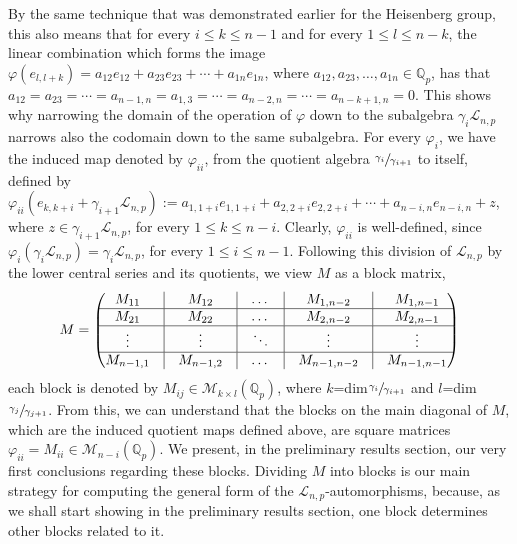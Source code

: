 \documentclass[12pt]{article}
\begin{document}
By the same technique that was demonstrated earlier for the Heisenberg group, this also means that for every $i\leq k\leq n-1$ and for every $1\leq l\leq n-k$, the linear combination which forms the image $\varphi(e_{l,l+k})=a_{12}e_{12}+a_{23}e_{23}+\cdots+a_{1n}e_{1n}$, where $a_{12},a_{23},\dots,a_{1n}\in\mathbb{Q}_p$, has that $a_{12}=a_{23}=\cdots=a_{n-1,n}=a_{1,3}=\cdots=a_{n-2,n}=\cdots=a_{n-k+1,n}=0$. This shows why narrowing the domain of the operation of $\varphi$ down to the subalgebra $\gamma_i\mathcal{L}_{n,p}$ narrows also the codomain down to the same subalgebra. For every $\varphi_i$, we have the induced map denoted by $\varphi_{ii}$, from the quotient algebra $\sfrac{\gamma_i}{\gamma_{i+1}}$ to itself, defined by $\varphi_{ii}(e_{k,k+i}+\gamma_{i+1}\mathcal{L}_{n,p}):=a_{1,1+i}e_{1,1+i}+a_{2,2+i}e_{2,2+i}+\cdots+a_{n-i,n}e_{n-i,n}+z$, where $z\in\gamma_{i+1}\mathcal{L}_{n,p}$, for every $1\leq k\leq n-i$. Clearly, $\varphi_{ii}$ is well-defined, since $\varphi_i(\gamma_i\mathcal{L}_{n,p})=\gamma_i\mathcal{L}_{n,p}$, for every $1\leq i\leq n-1$.
Following this division of $\mathcal{L}_{n,p}$ by the lower central series and its quotients, we view $M$ as a block matrix, $$M=\begin{pmatrix}
M_{11} & \vline & M_{12}&\vline & \dots& \vline & M_{1,n-2} & \vline&M_{1,n-1}\\
\hline
M_{21} & \vline & M_{22}&\vline & \dots &\vline & M_{2,n-2} &\vline& M_{2,n-1}\\
\hline
\vdots & \vline & \vdots&\vline & \ddots &\vline & \vdots &\vline& \vdots\\
\hline
M_{n-1,1} & \vline & M_{n-1,2}&\vline & \dots &\vline & M_{n-1,n-2} &\vline& M_{n-1,n-1}\\
\end{pmatrix}
$$
each block is denoted by $M_{ij}\in\mathcal{M}_{k\times l}(\mathbb{Q}_p)$, where $k$=dim$\sfrac{\gamma_i}{\gamma_{i+1}}$ and $l$=dim$\sfrac{\gamma_j}{\gamma_{j+1}}$. From this, we can understand that the blocks on the main diagonal of $M$, which are the induced quotient maps defined above, are square matrices $\varphi_{ii}=M_{ii}\in\mathcal{M}_{n-i}(\mathbb{Q}_p)$. We present, in the preliminary results section, our very first conclusions regarding these blocks. Dividing $M$ into blocks is our main strategy for computing the general form of the $\mathcal{L}_{n,p}$-automorphisms, because, as we shall start showing in the preliminary results section, one block determines other blocks related to it.
\end{document}
